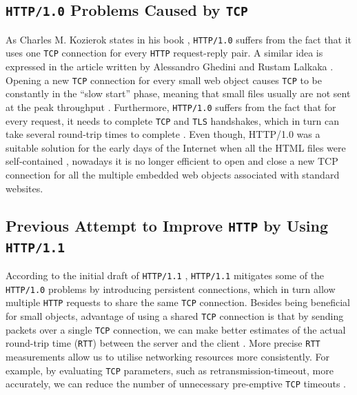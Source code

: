 \documentclass[12pt,a4paper,twoside,openright]{report}
\begin{document}
\subsection{\texttt{HTTP/1.0} Problems Caused by \texttt{TCP}}
    As Charles M. Kozierok states in his book \cite{TCP_IP_Guide_Book},
    \texttt{HTTP/1.0} suffers from the fact that it uses one \texttt{TCP} connection for every \texttt{HTTP} request-reply pair. 
    A similar idea is expressed in the article written by Alessandro Ghedini and Rustam Lalkaka
    \cite{HTTP_3_the_past_the_present_and_the_future}.
    Opening a new \texttt{TCP} connection for every small web object causes \texttt{TCP} to be constantly in the \enquote{slow start} phase, meaning that small files usually are not sent at the peak throughput \cite{HTTP_3_the_past_the_present_and_the_future}.
    Furthermore, \texttt{HTTP/1.0} suffers from the fact that for every request, it needs to complete \texttt{TCP} and \texttt{TLS} handshakes, which in turn can take several round-trip times to complete \cite{HTTP_3_the_past_the_present_and_the_future}.
    Even though, HTTP/1.0 was a suitable solution for the early days of the Internet when all the HTML files were self-contained \cite{TCP_IP_Guide_Book_2}, nowadays it is no longer efficient to open and close a new TCP connection for all the multiple embedded web objects associated with standard websites.

\subsection{Previous Attempt to Improve \texttt{HTTP} by Using \texttt{HTTP/1.1}}

According to the initial draft of \texttt{HTTP/1.1} \cite{RFC2068}, \texttt{HTTP/1.1} mitigates some of the \texttt{HTTP/1.0} problems by introducing persistent connections, which in turn allow multiple \texttt{HTTP} requests to share the same \texttt{TCP} connection.
Besides being beneficial for small objects, advantage of using a shared \texttt{TCP} connection is that by sending packets over a single \texttt{TCP} connection, we can make better estimates of the actual round-trip time (\texttt{RTT}) between the server and the client \cite{bib_Computer_Networking_L6}.
More precise \texttt{RTT} measurements allow us to utilise networking resources more consistently.
For example, by evaluating \texttt{TCP} parameters, such as retransmission-timeout, more accurately, we can reduce the number of unnecessary pre-emptive \texttt{TCP} timeouts \cite{bib_rtt_tcp_Retransmissions}.
\end{document}
